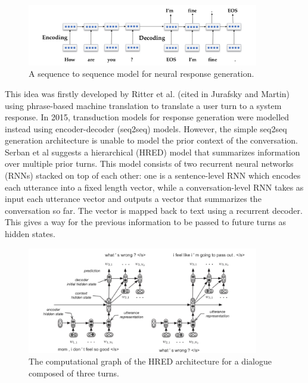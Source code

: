 \documentclass[bsc,frontabs,twoside,singlespacing,parskip,deptreport]{infthesis}     %
\begin{document}
\begin{figure}[h]
    \centering
    \includegraphics[width=0.9\textwidth]{seq2seq.jpeg}
    \caption{A sequence to sequence model for neural response generation.\cite{jurafsky2019speech}}
    \label{fig:seq2seq}
\end{figure}

This idea was firstly developed by Ritter et al\cite{ritter2011data}. (cited in Jurafsky and Martin\cite{jurafsky2019speech}) using phrase-based machine translation to translate a user turn to a system response. In 2015, transduction models for response generation were modelled instead using encoder-decoder (seq2seq) models\cite{shang2015neural,strub2017end,sordoni2015neural}. However, the simple seq2seq generation architecture is unable to model the prior context of the conversation. Serban et al\cite{serban2016building} suggests a hierarchical (HRED) model that summarizes information over multiple prior turns. This model consists of two recurrent neural networks (RNNs) stacked on top of each other: one is a sentence-level RNN which encodes each utterance into a fixed length vector, while a conversation-level RNN takes as input each utterance vector and outputs a vector that summarizes the conversation so far. The vector is mapped back to text using a recurrent decoder. This gives a way for the previous information to be passed to future turns as hidden states\cite{lowe2017training}.

\begin{figure}[h]
    \centering
    \includegraphics[width=0.9\textwidth]{HERD.jpeg}
    \caption{The computational graph of the HRED architecture for a dialogue composed of three turns.}
    \label{fig:HERD}
\end{figure}
\end{document}
